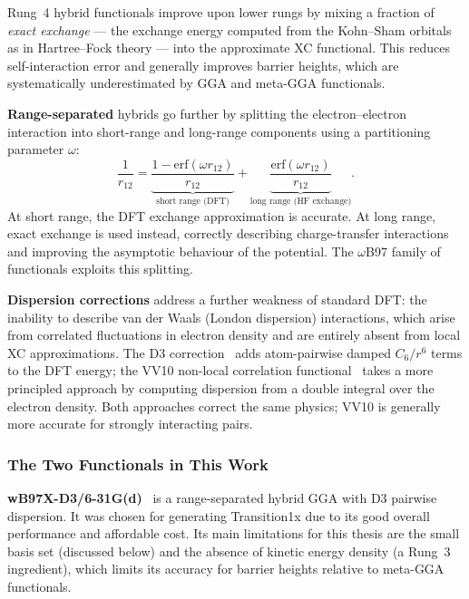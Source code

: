 Rung~4 hybrid functionals improve upon lower rungs by mixing a fraction of
\emph{exact exchange} --- the exchange energy computed from the Kohn--Sham
orbitals as in Hartree--Fock theory --- into the approximate XC functional.
This reduces self-interaction error and generally improves barrier heights, which
are systematically underestimated by GGA and meta-GGA functionals.

\textbf{Range-separated} hybrids go further by splitting the electron--electron
interaction into short-range and long-range components using a partitioning
parameter $\omega$:
%
\begin{equation}
  \frac{1}{r_{12}} = \underbrace{\frac{1-\text{erf}(\omega r_{12})}{r_{12}}}_{\text{short range (DFT)}}
  + \underbrace{\frac{\text{erf}(\omega r_{12})}{r_{12}}}_{\text{long range (HF exchange)}}.
\end{equation}
%
At short range, the DFT exchange approximation is accurate. At long range, exact
exchange is used instead, correctly describing charge-transfer interactions and
improving the asymptotic behaviour of the potential. The $\omega$B97 family of
functionals exploits this splitting.

\textbf{Dispersion corrections} address a further weakness of standard DFT: the
inability to describe van der Waals (London dispersion) interactions, which arise
from correlated fluctuations in electron density and are entirely absent from local
XC approximations. The D3 correction~\cite{grimme2010} adds atom-pairwise damped
$C_6/r^6$ terms to the DFT energy; the VV10 non-local correlation
functional~\cite{vydrov2010} takes a more principled approach by computing
dispersion from a double integral over the electron density. Both approaches
correct the same physics; VV10 is generally more accurate for strongly interacting
pairs.

\subsubsection{The Two Functionals in This Work}

\textbf{\mbox{wB97X-D3/6-31G(d)}}~\cite{lin2013} is a range-separated hybrid
GGA with D3 pairwise dispersion. It was chosen for generating Transition1x due to
its good overall performance and affordable cost. Its main limitations for this
thesis are the small basis set (discussed below) and the absence of kinetic energy
density (a Rung~3 ingredient), which limits its accuracy for barrier heights
relative to meta-GGA functionals.


